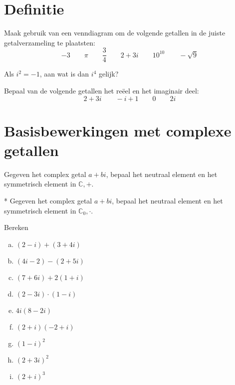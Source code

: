 \documentclass[12pt,twoside]{article}
\begin{document}
\section{Definitie}

\begin{oefening}
  Maak gebruik van een venndiagram om de volgende getallen in de juiste getalverzameling te plaatsten:
  $$-3\qquad\pi\qquad\dfrac{3}{4}\qquad2+3i\qquad10^{10}\qquad-\sqrt{9}$$
\end{oefening}

\begin{oefening}
  Als $i^2=-1$, aan wat is dan $i^4$ gelijk?
\end{oefening}

\begin{oefening}
  Bepaal van de volgende getallen het reëel en het imaginair deel:
  $$2+3i\qquad -i+1\qquad 0 \qquad 2i$$
\end{oefening}

\pagebreak
\section{Basisbewerkingen met complexe getallen}

\begin{oefening}
  Gegeven het complex getal $a+bi$, bepaal het neutraal element en het symmetrisch element in $\mathbb{C}, +$.
\end{oefening}

\begin{oefening}*
  Gegeven het complex getal $a+bi$, bepaal het neutraal element en het symmetrisch element in $\mathbb{C}_0, \cdot$.
\end{oefening}


\begin{oefening}
  Bereken
  \begin{enumerate}[(a)]
  \item $\displaystyle (2-i)+(3+4i)$
  \item $\displaystyle (4i-2)-(2+5i)$
  \item $\displaystyle (7+6i)+2(1+i)$
  \item $\displaystyle (2-3i)\cdot (1-i)$
  \item $\displaystyle 4i(8-2i)$
  \item $\displaystyle (2+i)(-2+i)$
  \item $\displaystyle (1-i)^2$
  \item $\displaystyle (2+3i)^2$
  \item $\displaystyle (2+i)^3$
  \end{enumerate}
\end{oefening}
\end{document}
